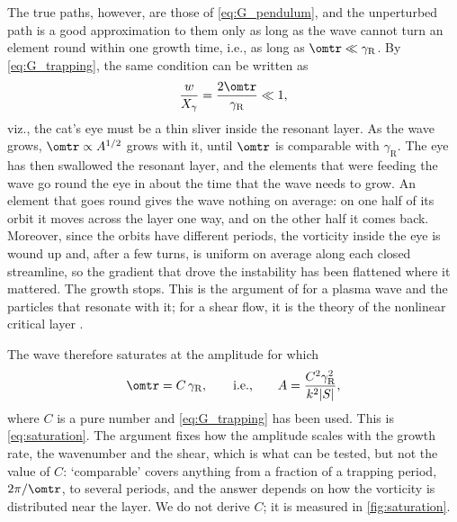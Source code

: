 The true paths, however, are those of \cref{eq:G_pendulum}, and the unperturbed path is a good approximation to them only as long as the wave cannot turn an element round within one growth time, i.e., as long as \(\omtr\ll\gamma_\text{R}\). By \cref{eq:G_trapping}, the same condition can be written as
\begin{equation}
\frac{w}{X_\gamma} = \frac{2\omtr}{\gamma_\text{R}} \ll 1,
\label{eq:G_ratio}
\end{equation}
viz., the cat's eye must be a thin sliver inside the resonant layer. As the wave grows, \(\omtr\propto A^{1/2}\) grows with it, until \(\omtr\) is comparable with \(\gamma_\text{R}\). The eye has then swallowed the resonant layer, and the elements that were feeding the wave go round the eye in about the time that the wave needs to grow. An element that goes round gives the wave nothing on average: on one half of its orbit it moves across the layer one way, and on the other half it comes back. Moreover, since the orbits have different periods, the vorticity inside the eye is wound up and, after a few turns, is uniform on average along each closed streamline, so the gradient that drove the instability has been flattened where it mattered. The growth stops. This is the argument of \citet{ONeil1965} for a plasma wave and the particles that resonate with it; for a shear flow, it is the theory of the nonlinear critical layer \citep{Stewartson1978, WarnWarn1978}.

The wave therefore saturates at the amplitude for which
\begin{equation}
\omtr = C\,\gamma_\text{R},
\qquad\text{i.e.,}\qquad
A = \frac{C^2\gamma_\text{R}^2}{k^2|S|},
\label{eq:G_saturation}
\end{equation}
where \(C\) is a pure number and \cref{eq:G_trapping} has been used. This is \cref{eq:saturation}. The argument fixes how the amplitude scales with the growth rate, the wavenumber and the shear, which is what can be tested, but not the value of \(C\): `comparable' covers anything from a fraction of a trapping period, \(2\pi/\omtr\), to several periods, and the answer depends on how the vorticity is distributed near the layer. We do not derive \(C\); it is measured in \cref{fig:saturation}.

